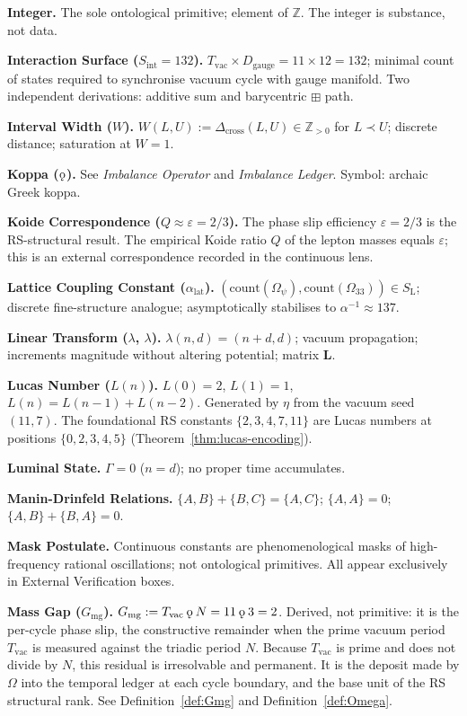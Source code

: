 \documentclass[11pt, letterpaper]{article}
\newcommand{\Z}{\mathbb{Z}}
\newcommand{\SL}{S_{\mathrm{L}}}
\newcommand{\lop}{\lambda}
\newcommand{\aop}{\eta}
\newcommand{\bplus}{\boxplus}
\newcommand{\Dcross}{\Delta_{\mathrm{cross}}}
\newcommand{\koppa}{\mathbin{\text{\rm\k{o}}}}
\newcommand{\Tcharge}{\Gamma}
\newcommand{\Dg}{D_{\mathrm{gauge}}}
\newcommand{\Sint}{S_{\mathrm{int}}}
\newcommand{\Lalpha}{\alpha_{\mathrm{lat}}}
\theoremstyle{definition}
\theoremstyle{plain}
\begin{document}
\medskip\noindent\textbf{Integer.}
The sole ontological primitive; element of $\Z$.  The integer is substance,
not data.

\medskip\noindent\textbf{Interaction Surface ($\Sint=132$).}
$T_{\mathrm{vac}}\times\Dg=11\times 12=132$; minimal count of states required
to synchronise vacuum cycle with gauge manifold.  Two independent
derivations: additive sum and barycentric $\bplus$ path.

\medskip\noindent\textbf{Interval Width ($W$).}
$W(L,U):=\Dcross(L,U)\in\Z_{>0}$ for $L\prec U$; discrete distance;
saturation at $W=1$.

\medskip\noindent\textbf{Koppa ($\koppa$).}
See \textit{Imbalance Operator} and \textit{Imbalance Ledger}.  Symbol:
archaic Greek koppa.

\medskip\noindent\textbf{Koide Correspondence ($Q\approx\varepsilon=2/3$).}
The phase slip efficiency $\varepsilon=2/3$ is the RS-structural result.  The
empirical Koide ratio $Q$ of the lepton masses equals $\varepsilon$; this is
an external correspondence recorded in the continuous lens.

\medskip\noindent\textbf{Lattice Coupling Constant ($\Lalpha$).}
$(\mathrm{count}(\Omega_\psi),\mathrm{count}(\Omega_{33}))\in\SL$; discrete
fine-structure analogue; asymptotically stabilises to $\alpha^{-1}\approx 137$.

\medskip\noindent\textbf{Linear Transform ($\lambda$, $\lop$).}
$\lop(n,d)=(n+d,d)$; vacuum propagation; increments magnitude without
altering potential; matrix $\mathbf{L}$.

\medskip\noindent\textbf{Lucas Number ($L(n)$).}
$L(0)=2$, $L(1)=1$, $L(n)=L(n-1)+L(n-2)$.  Generated by $\aop$ from the
vacuum seed $(11,7)$.  The foundational RS constants $\{2,3,4,7,11\}$ are
Lucas numbers at positions $\{0,2,3,4,5\}$ (Theorem~\ref{thm:lucas-encoding}).

\medskip\noindent\textbf{Luminal State.}
$\Tcharge=0$ ($n=d$); no proper time accumulates.

\medskip\noindent\textbf{Manin-Drinfeld Relations.}
$\{A,B\}+\{B,C\}=\{A,C\}$; $\{A,A\}=0$; $\{A,B\}+\{B,A\}=0$.

\medskip\noindent\textbf{Mask Postulate.}
Continuous constants are phenomenological masks of high-frequency rational
oscillations; not ontological primitives.  All appear exclusively in External
Verification boxes.

\medskip\noindent\textbf{Mass Gap ($G_{\mathrm{mg}}$).}
$G_{\mathrm{mg}} := T_{\mathrm{vac}}\koppa N = 11\koppa 3 = 2$.
Derived, not primitive: it is the per-cycle phase slip, the constructive
remainder when the prime vacuum period $T_{\mathrm{vac}}$ is measured
against the triadic period $N$.  Because $T_{\mathrm{vac}}$ is prime and
does not divide by $N$, this residual is irresolvable and permanent.
It is the deposit made by $\Omega$ into the temporal ledger at each cycle
boundary, and the base unit of the RS structural rank.  See
Definition~\ref{def:Gmg} and Definition~\ref{def:Omega}.
\end{document}
